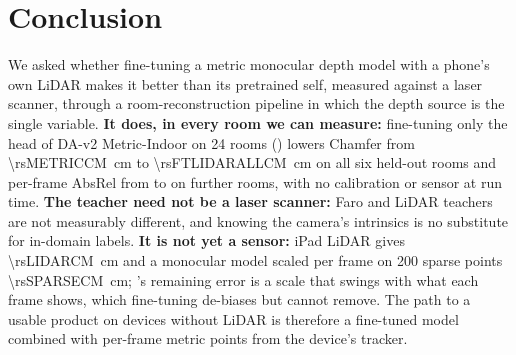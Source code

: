 \section{Conclusion}
We asked whether fine-tuning a metric monocular depth model with a phone's own LiDAR makes it better than its
pretrained self, measured against a laser scanner, through a room-reconstruction pipeline in which the depth source is
the single variable. \textbf{It does, in every room we can measure:} fine-tuning only the head of DA-v2 Metric-Indoor
on 24 rooms (\ftmain{}) lowers Chamfer from \SI{\rsMETRICCM}{cm} to \SI{\rsFTLIDARALLCM}{cm} on all six held-out rooms and
per-frame AbsRel from \rsVMETRICABSREL{} to \rsVFTALLABSREL{} on \rsVN{} further rooms, with no calibration or sensor
at run time. \textbf{The teacher need not be a laser scanner:} Faro and LiDAR teachers are not measurably different,
and knowing the camera's intrinsics is no substitute for in-domain labels. \textbf{It is not yet a sensor:} iPad LiDAR
gives \SI{\rsLIDARCM}{cm} and a monocular model scaled per frame on 200 sparse points \SI{\rsSPARSECM}{cm}; \ftmain{}'s
remaining error is a scale that swings with what each frame shows, which fine-tuning de-biases but cannot remove. The
path to a usable product on devices without LiDAR is therefore a fine-tuned model combined with per-frame metric points
from the device's tracker.
